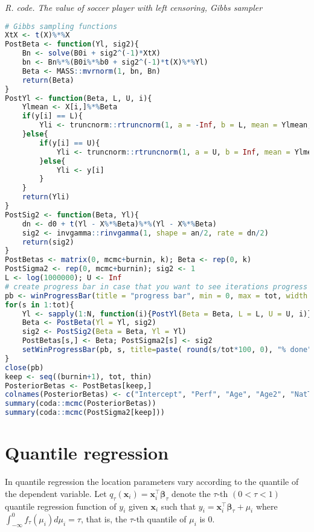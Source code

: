 \begin{tcolorbox}[enhanced,width=4.67in,center upper,
	fontupper=\large\bfseries,drop shadow southwest,sharp corners]
	\textit{R. code. The value of soccer player with left censoring, Gibbs sampler}
	\begin{VF}
		\begin{lstlisting}[language=R]
# Gibbs sampling functions
XtX <- t(X)%*%X
PostBeta <- function(Yl, sig2){
	Bn <- solve(B0i + sig2^(-1)*XtX)
	bn <- Bn%*%(B0i%*%b0 + sig2^(-1)*t(X)%*%Yl)
	Beta <- MASS::mvrnorm(1, bn, Bn)
	return(Beta)
}
PostYl <- function(Beta, L, U, i){
	Ylmean <- X[i,]%*%Beta
	if(y[i] == L){
		Yli <- truncnorm::rtruncnorm(1, a = -Inf, b = L, mean = Ylmean, sd = sig2^0.5)
	}else{
		if(y[i] == U){
			Yli <- truncnorm::rtruncnorm(1, a = U, b = Inf, mean = Ylmean, sd = sig2^0.5)
		}else{
			Yli <- y[i]
		}
	}
	return(Yli)
}
PostSig2 <- function(Beta, Yl){
	dn <- d0 + t(Yl - X%*%Beta)%*%(Yl - X%*%Beta)
	sig2 <- invgamma::rinvgamma(1, shape = an/2, rate = dn/2)
	return(sig2)
}
PostBetas <- matrix(0, mcmc+burnin, k); Beta <- rep(0, k)
PostSigma2 <- rep(0, mcmc+burnin); sig2 <- 1
L <- log(1000000); U <- Inf
# create progress bar in case that you want to see iterations progress
pb <- winProgressBar(title = "progress bar", min = 0, max = tot, width = 300)
for(s in 1:tot){
	Yl <- sapply(1:N, function(i){PostYl(Beta = Beta, L = L, U = U, i)})
	Beta <- PostBeta(Yl = Yl, sig2)
	sig2 <- PostSig2(Beta = Beta, Yl = Yl) 
	PostBetas[s,] <- Beta; PostSigma2[s] <- sig2
	setWinProgressBar(pb, s, title=paste( round(s/tot*100, 0), "% done"))
}
close(pb)
keep <- seq((burnin+1), tot, thin)
PosteriorBetas <- PostBetas[keep,]
colnames(PosteriorBetas) <- c("Intercept", "Perf", "Age", "Age2", "NatTeam", "Goals", "Exp", "Exp2")
summary(coda::mcmc(PosteriorBetas))
summary(coda::mcmc(PostSigma2[keep]))
\end{lstlisting}
	\end{VF}
\end{tcolorbox} 

\section{Quantile regression}\label{sec69}
In quantile regression the location parameters vary according to the quantile of the dependent variable. Let $q_{\tau}(\bm{x}_i)=\bm{x}_i^{\top}\bm{\beta}_{\tau}$ denote the $\tau$-th $(0<\tau<1)$ quantile regression function of $y_i$ given $\bm{x}_i$ such that $y_i=\bm{x}_i^{\top}\bm{\beta}_{\tau}+\mu_i$ where $\int_{-\infty}^{0}f_{\tau}(\mu_i)d\mu_i=\tau$, that is, the $\tau$-th quantile of $\mu_i$ is 0.

